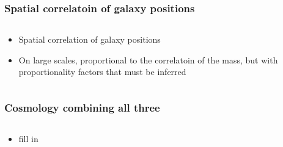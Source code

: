 \documentclass{beamer}
\begin{document}
\frame
{
    \frametitle{Spatial correlatoin of galaxy positions}


    \begin{columns}
        \begin{column}{0.5\textwidth}    
            \begin{itemize}

                \item Spatial correlation of galaxy positions 

                \item On large scales, proportional to the correlatoin of the
                    mass, but with proportionality factors that must be inferred

            \end{itemize}
        \end{column}
        \begin{column}{0.5\textwidth}
        \end{column}
    \end{columns}

}

\frame
{
    \frametitle{Cosmology combining all three}


    \begin{columns}
        \begin{column}{0.5\textwidth}    
            \begin{itemize}

                \item fill in

            \end{itemize}
        \end{column}
        \begin{column}{0.5\textwidth}
        \end{column}
    \end{columns}

}
\end{document}
